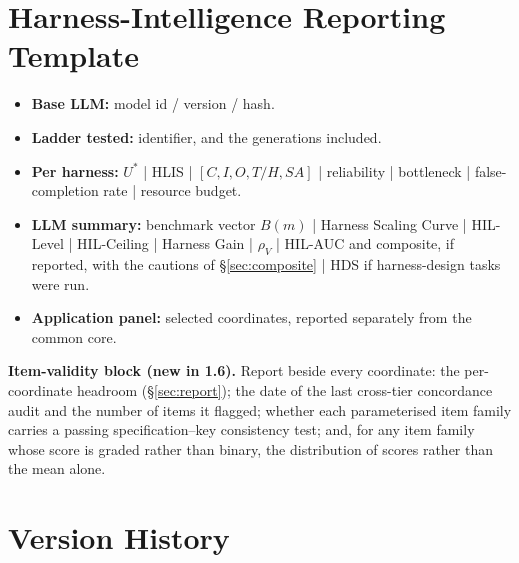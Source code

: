 \documentclass[11pt]{article}
\theoremstyle{definition}
\newcommand{\rhov}{\ensuremath{\rho_V}}
\begin{document}
\section{Harness-Intelligence Reporting Template}

\begin{itemize}
\item \textbf{Base LLM:} model id / version / hash.
\item \textbf{Ladder tested:} identifier, and the generations included.
\item \textbf{Per harness:} $U^{*}$ | HLIS | $[C,I,O,T/H,SA]$ | reliability | bottleneck | false-completion rate | resource budget.
\item \textbf{LLM summary:} benchmark vector $B(m)$ | Harness Scaling Curve | HIL-Level | HIL-Ceiling | Harness Gain | \rhov{} | HIL-AUC and composite, if reported, with the cautions of \S\ref{sec:composite} | HDS if harness-design tasks were run.
\item \textbf{Application panel:} selected coordinates, reported separately from the common core.
\end{itemize}

\noindent\textbf{Item-validity block (new in 1.6).} Report beside every coordinate: the per-coordinate headroom (\S\ref{sec:report}); the date of the last cross-tier concordance audit and the number of items it flagged; whether each parameterised item family carries a passing specification--key consistency test; and, for any item family whose score is graded rather than binary, the distribution of scores rather than the mean alone.

\section{Version History}
\end{document}
